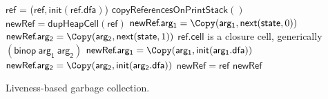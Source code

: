 \documentclass[9pt,preprint,nonatbib]{sigplanconf}
\begin{document}
\begin{algorithm}[t!]
  \Pro{\Lgc{}}
     {
            {$\mathsf{ref}$ = \Copy($\mathsf{ref}, \mathsf{init}(\mathsf{ref.dfa})$)\;}
            ${\mathsf{copyReferencesOnPrintStack}()}$\;  
     }
        {
             {
               $\mathsf{newRef} = \mathsf{dupHeapCell}(\mathsf{ref})$\;
                  {
                    {
                      $\mathsf{newRef}\!.\mathsf{arg_1}  = \Copy(\mathsf{arg_1}, \mathsf{next}(\mathsf{state}, 0))$\;
                    }
                    {
                      $\mathsf{newRef}\!.\mathsf{arg_2} =  \Copy(\mathsf{arg_2},
                      \mathsf{next}(\mathsf{state} , 1))$\;
                    }    
                  }
               \If
                  {$\mathsf{ref\!.cell}$ is a
                    closure cell, generically  $\mathsf{(binop~arg_1~arg_2)}$}
                   { 
                     $\mathsf{newRef}\!.\mathsf{arg_1} = \Copy(\mathsf{arg_1}, \mathsf{init}(\mathsf{arg_1.dfa}))$\;
                     $\mathsf{newRef}\!.\mathsf{arg_2} = \Copy(\mathsf{arg_2}, \mathsf{init}(\mathsf{arg_2.dfa}))$\;
                   }
             }
             {$\mathsf{newRef = ref}$}
\KwRet $\mathsf{newRef}$\;
        }
        \caption{Liveness-based garbage collection.  \label{algo:lgc-a}}
\end{algorithm}



\newcommand{\wdh}{.33\textwidth}
\newcommand{\LGCLine}{blue}
\newcommand{\RGCLine}{red}
\newcommand{\ReachLine}{black}
\newcommand{\UseLine}{light-blue}
\end{document}
